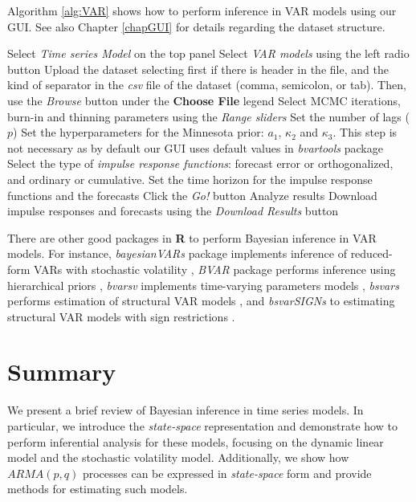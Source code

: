 Algorithm \ref{alg:VAR} shows how to perform inference in VAR models using our GUI. See also Chapter \ref{chapGUI} for details regarding the dataset structure. 

\begin{algorithm}[h!]
	\caption{Vector Autoregressive models}\label{alg:VAR}
	\begin{algorithmic}[1]  		 			
		\State Select \textit{Time series Model} on the top panel
		\State Select \textit{VAR models} using the left radio button
		\State Upload the dataset selecting first if there is header in the file, and the kind of separator in the \textit{csv} file of the dataset (comma, semicolon, or tab). Then, use the \textit{Browse} button under the \textbf{Choose File} legend
		\State Select MCMC iterations, burn-in and thinning parameters using the \textit{Range sliders}
		\State Set the number of lags ($p$)
		\State Set the hyperparameters for the Minnesota prior: $a_1$, $\kappa_2$ and $\kappa_3$. This step is not necessary as by default our GUI uses default values in \textit{bvartools} package
		\State Select the type of \textit{impulse response functions}: forecast error or orthogonalized, and ordinary or cumulative.
		\State Set the time horizon for the impulse response functions and the forecasts 
		\State Click the \textit{Go!} button
		\State Analyze results
		\State Download impulse responses and forecasts using the \textit{Download Results} button
	\end{algorithmic} 
\end{algorithm}

There are other good packages in \textbf{R} to perform Bayesian inference in VAR models. For instance, \textit{bayesianVARs} package implements inference of reduced-form VARs with stochastic volatility \cite{Gruber2024}, \textit{BVAR} package performs inference using hierarchical priors \cite{Kuschnig2024}, \textit{bvarsv} implements time-varying parameters models \cite{Krueger2022}, \textit{bsvars} performs estimation of structural VAR models \cite{Tomasz2024}, and \textit{bsvarSIGNs} to estimating structural VAR models with sign restrictions \cite{Wang2024}. 
 
\section{Summary}\label{sec85}
We present a brief review of Bayesian inference in time series models. In particular, we introduce the \textit{state-space} representation and demonstrate how to perform inferential analysis for these models, focusing on the dynamic linear model and the stochastic volatility model. Additionally, we show how $ARMA(p,q)$ processes can be expressed in \textit{state-space} form and provide methods for estimating such models.


